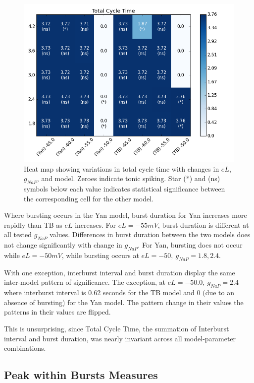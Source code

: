 \documentclass[11pt]{article}
\begin{document}
\begin{figure}[h]
	\includegraphics[scale=0.4]{heatmap_Total_Cycle_Time.png}
	\caption{Heat map showing variations in total cycle time with changes in $eL$, $g_{NaP}$, and model. Zeroes indicate tonic spiking. Star (*) and (ns) symbols below each value indicates statistical significance between the corresponding cell for the other model.}
	\label{fig:hmTCT}
\end{figure}

   


Where bursting occurs in the Yan model, burst duration for Yan increases more rapidly than TB as $eL$ increases. For $eL=-55 mV$, burst duration is different at all tested $g_{NaP}$ values.
Differences in burst duration between the two models does not change significantly with change in $g_{NaP}$. For Yan, bursting does not occur while $eL = -50 mV$, while bursting occurs at $eL=-50,\  g_{NaP}=1.8, 2.4$. 

With one exception, interburst interval and burst duration display the same inter-model pattern of significance. The exception, at $eL=-50.0,\ g_{NaP} = 2.4$ where interburst interval is 0.62 seconds for the TB model and 0 (due to an absence of bursting) for the Yan model. 
The pattern change in their values 
the patterns in their values are flipped.

This is unsurprising, since Total Cycle Time, the summation of Interburst interval and burst duration, was nearly invariant across all model-parameter combinations. 

\subsection{Peak within Bursts Measures}
\end{document}
